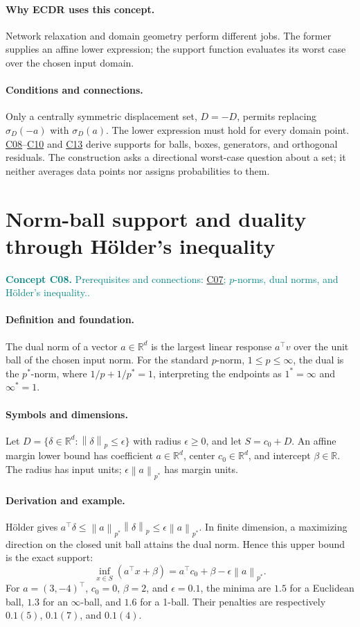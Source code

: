 \documentclass[11pt,a4paper]{article}
\newcommand{\R}{\mathbb R}
\newcommand{\norm}[1]{\left\lVert#1\right\rVert}
\newcommand{\conceptid}{Front matter}
\newcommand{\concept}[3]{\clearpage\renewcommand{\conceptid}{#1}%
\section{#2}\label{concept:#1}%
\textcolor{teal}{\textbf{Concept #1.} Prerequisites and connections: #3.}\par
\typeout{ECDR-CONCEPT-START #1 PAGE=\thepage}}
\begin{document}
\paragraph{Why ECDR uses this concept.}
Network relaxation and domain geometry perform different jobs. The former supplies an affine lower expression; the support function evaluates its worst case over the chosen input domain.
\paragraph{Conditions and connections.}
Only a centrally symmetric displacement set, $D=-D$, permits replacing $\sigma_D(-a)$ with $\sigma_D(a)$. The lower expression must hold for every domain point. \hyperref[concept:C08]{C08}--\hyperref[concept:C10]{C10} and \hyperref[concept:C13]{C13} derive supports for balls, boxes, generators, and orthogonal residuals. The construction asks a directional worst-case question about a set; it neither averages data points nor assigns probabilities to them.
\par\label{endconcept:C07}

\concept{C08}{Norm-ball support and duality through Hölder's inequality}{\hyperref[concept:C07]{C07}; $p$-norms, dual norms, and Hölder's inequality.}
\paragraph{Definition and foundation.}
The dual norm of a vector $a\in\R^d$ is the largest linear response $a^\top v$ over the unit ball of the chosen input norm. For the standard $p$-norm, $1\le p\le\infty$, the dual is the $p^*$-norm, where $1/p+1/p^*=1$, interpreting the endpoints as $1^*=\infty$ and $\infty^*=1$.
\paragraph{Symbols and dimensions.}
Let $D=\{\delta\in\R^d:\norm{\delta}_p\le\epsilon\}$ with radius $\epsilon\ge0$, and let $S=c_0+D$. An affine margin lower bound has coefficient $a\in\R^d$, center $c_0\in\R^d$, and intercept $\beta\in\R$. The radius has input units; $\epsilon\norm{a}_{p^*}$ has margin units.
\paragraph{Derivation and example.}
Hölder gives $a^\top\delta\le\norm{a}_{p^*}\norm{\delta}_p\le\epsilon\norm{a}_{p^*}$. In finite dimension, a maximizing direction on the closed unit ball attains the dual norm. Hence this upper bound is the exact support:
\[
 \inf_{x\in S}(a^\top x+\beta)
 =a^\top c_0+\beta-\epsilon\norm{a}_{p^*}.
\]
For $a=(3,-4)^\top$, $c_0=0$, $\beta=2$, and $\epsilon=0.1$, the minima are $1.5$ for a Euclidean ball, $1.3$ for an $\infty$-ball, and $1.6$ for a 1-ball. Their penalties are respectively $0.1(5)$, $0.1(7)$, and $0.1(4)$.
\end{document}
